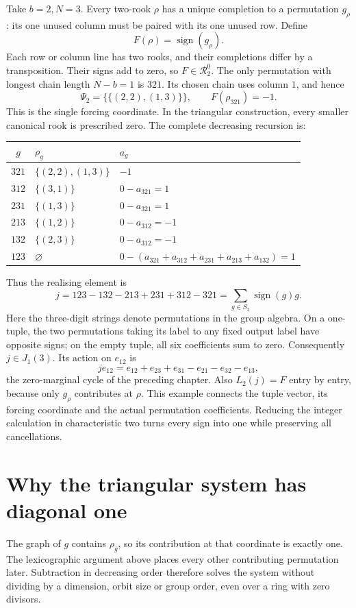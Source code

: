 \begin{example}\label{tx:eg:two-rook-cycle}
Take $b=2,N=3$. Every two-rook $\rho$ has a unique completion to a permutation $g_\rho$: its one unused column must be paired with its one unused row. Define
\[
                       F(\rho)=\operatorname{sign}(g_\rho).
\]
Each row or column line has two rooks, and their completions differ by a transposition. Their signs add to zero, so $F\in\mathcal R_2^0$. The only permutation with longest chain length $N-b=1$ is $321$. Its chosen chain uses column $1$, and hence
\[
            \Psi_2=\bigl\{\{(2,2),(1,3)\}\bigr\},
            \qquad F(\rho_{321})=-1.
\]
This is the single forcing coordinate. In the triangular construction, every smaller canonical rook is prescribed zero. The complete decreasing recursion is:
\begin{center}
\begin{tabular}{@{}cll@{}}
\toprule
$g$ & $\rho_g$ & $a_g$\\
\midrule
$321$ & $\{(2,2),(1,3)\}$ & $-1$\\
$312$ & $\{(3,1)\}$ & $0-a_{321}=1$\\
$231$ & $\{(1,3)\}$ & $0-a_{321}=1$\\
$213$ & $\{(1,2)\}$ & $0-a_{312}=-1$\\
$132$ & $\{(2,3)\}$ & $0-a_{312}=-1$\\
$123$ & $\varnothing$ & $0-(a_{321}+a_{312}+a_{231}+a_{213}+a_{132})=1$\\
\bottomrule
\end{tabular}
\end{center}
Thus the realising element is
\[
 j=123-132-213+231+312-321
   =\sum_{g\in S_3}\operatorname{sign}(g)g.
\]
Here the three-digit strings denote permutations in the group algebra. On a one-tuple, the two permutations taking its label to any fixed output label have opposite signs; on the empty tuple, all six coefficients sum to zero. Consequently $j\in J_1(3)$. Its action on $e_{12}$ is
\[
 j e_{12}=e_{12}+e_{23}+e_{31}-e_{21}-e_{32}-e_{13},
\]
the zero-marginal cycle of the preceding chapter. Also $L_2(j)=F$ entry by entry, because only $g_\rho$ contributes at $\rho$. This example connects the tuple vector, its forcing coordinate and the actual permutation coefficients. Reducing the integer calculation in characteristic two turns every sign into one while preserving all cancellations.
\end{example}

\section{Why the triangular system has diagonal one}
The graph of $g$ contains $\rho_g$, so its contribution at that coordinate is exactly one. The lexicographic argument above places every other contributing permutation later. Subtraction in decreasing order therefore solves the system without dividing by a dimension, orbit size or group order, even over a ring with zero divisors.

